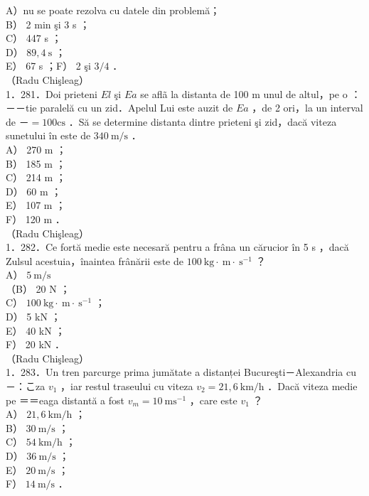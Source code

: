 {A）nu se poate rezolva cu datele din problemă；\\
B） 2 min şi 3 s ；\\
C） 447 s ；\\
D） $89,4 \mathrm{~s}$ ；\\
E） 67 s ；F） 2 şi $3 / 4$ ．\\
（Radu Chişleag）\\
1．281．Doi prieteni $E l$ şi $E a$ se aflã la distanta de 100 m unul de altul，pe o ：－－tie paralelă cu un zid．Apelul Lui este auzit de $E a$ ，de 2 ori，la un interval de －$=100 \mathrm{cs}$ ．Să se determine distanta dintre prieteni şi zid，dacă viteza sunetului în este de $340 \mathrm{~m} / \mathrm{s}$ ．\\
A） 270 m ；\\
B） 185 m ；\\
C） 214 m ；\\
D） 60 m ；\\
E） 107 m ；\\
F） 120 m ．\\
（Radu Chişleag）\\
1．282．Ce fortă medie este necesară pentru a frâna un cărucior în 5 s ，dacă Zulsul acestuia，înaintea frânării este de $100 \mathrm{~kg} \cdot \mathrm{~m} \cdot \mathrm{~s}^{-1}$ ？\\
A） $5 \mathrm{~m} / \mathrm{s}$\\
（B） 20 N ；\\
C） $100 \mathrm{~kg} \cdot \mathrm{~m} \cdot \mathrm{~s}^{-1}$ ；\\
D） 5 kN ；\\
E） 40 kN ；\\
F） 20 kN ．\\
（Radu Chişleag）\\
1．283．Un tren parcurge prima jumătate a distanței Bucureşti－Alexandria cu －：こza $v_{1}$ ，iar restul traseului cu viteza $v_{2}=21,6 \mathrm{~km} / \mathrm{h}$ ．Dacă viteza medie pe ＝＝eaga distantă a fost $v_{m}=10 \mathrm{~ms}^{-1}$ ，care este $v_{1}$ ？\\
A） $21,6 \mathrm{~km} / \mathrm{h}$ ；\\
B） $30 \mathrm{~m} / \mathrm{s}$ ；\\
C） $54 \mathrm{~km} / \mathrm{h}$ ；\\
D） $36 \mathrm{~m} / \mathrm{s}$ ；\\
E） $20 \mathrm{~m} / \mathrm{s}$ ；\\
F） $14 \mathrm{~m} / \mathrm{s}$ ．\\
}
